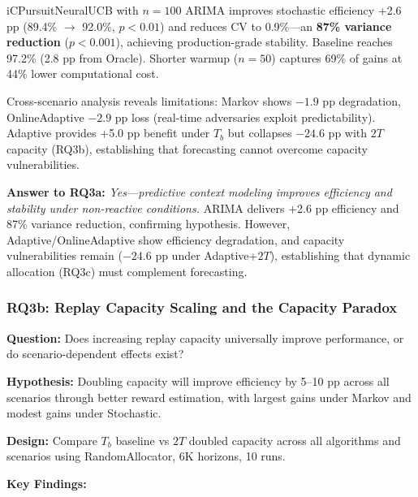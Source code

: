 iCPursuitNeuralUCB with $n=100$ ARIMA improves stochastic efficiency +2.6 pp (89.4\% $\to$ 92.0\%, $p<0.01$) and reduces CV to 0.9\%—an \textbf{87\% variance reduction} ($p<0.001$), achieving production-grade stability. Baseline reaches 97.2\% (2.8 pp from Oracle). Shorter warmup ($n=50$) captures 69\% of gains at 44\% lower computational cost.

Cross-scenario analysis reveals limitations: Markov shows $-1.9$ pp degradation, OnlineAdaptive $-2.9$ pp loss (real-time adversaries exploit predictability). Adaptive provides +5.0 pp benefit under $T_b$ but collapses $-24.6$ pp with $2T$ capacity (RQ3b), establishing that forecasting cannot overcome capacity vulnerabilities.

\noindent\textbf{Answer to RQ3a:} \textit{Yes—predictive context modeling improves efficiency and stability under non-reactive conditions.} ARIMA delivers +2.6 pp efficiency and 87\% variance reduction, confirming hypothesis. However, Adaptive/OnlineAdaptive show efficiency degradation, and capacity vulnerabilities remain ($-24.6$ pp under Adaptive+$2T$), establishing that dynamic allocation (RQ3c) must complement forecasting.


\subsubsection{RQ3b: Replay Capacity Scaling and the Capacity Paradox}

\noindent\textbf{Question:} Does increasing replay capacity universally improve performance, or do scenario-dependent effects exist?

\noindent\textbf{Hypothesis:} Doubling capacity will improve efficiency by 5--10 pp across all scenarios through better reward estimation, with largest gains under Markov and modest gains under Stochastic.

\noindent\textbf{Design:} Compare $T_b$ baseline vs $2T$ doubled capacity across all algorithms and scenarios using RandomAllocator, 6K horizons, 10 runs.

\noindent\textbf{Key Findings:}

